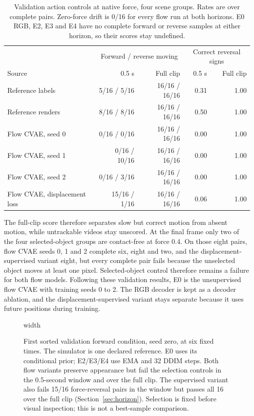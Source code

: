 \documentclass[11pt,a4paper]{article}
\begin{document}
\begin{table}[!ht]
\centering
\begin{tabular}{lrrrr}
\hline
 & \multicolumn{2}{c}{Forward / reverse moving} & \multicolumn{2}{c}{Correct reversal signs} \\
Source & 0.5 s & Full clip & 0.5 s & Full clip \\
\hline
Reference labels & 5/16 / 5/16 & 16/16 / 16/16 & 0.31 & 1.00 \\
Reference renders & 8/16 / 8/16 & 16/16 / 16/16 & 0.50 & 1.00 \\
Flow CVAE, seed 0 & 0/16 / 0/16 & 16/16 / 16/16 & 0.00 & 1.00 \\
Flow CVAE, seed 1 & 0/16 / 10/16 & 16/16 / 16/16 & 0.00 & 1.00 \\
Flow CVAE, seed 2 & 0/16 / 3/16 & 16/16 / 16/16 & 0.00 & 1.00 \\
Flow CVAE, displacement loss & 15/16 / 1/16 & 16/16 / 16/16 & 0.06 & 1.00 \\
\hline
\end{tabular}
\caption{Validation action controls at native force, four scene groups. Rates are over complete pairs. Zero-force drift is 0/16 for every flow run at both horizons. E0 RGB, E2, E3 and E4 have no complete forward or reverse samples at either horizon, so their scores stay undefined.}
\label{tab:horizon}
\end{table}

The full-clip score therefore separates slow but correct motion from absent motion, while untrackable videos stay unscored. At the final frame only two of the four selected-object groups are contact-free at force 0.4. On those eight pairs, flow CVAE seeds 0, 1 and 2 complete six, eight and two, and the displacement-supervised variant eight, but every complete pair fails because the unselected object moves at least one pixel. Selected-object control therefore remains a failure for both flow models. Following these validation results, E0 is the unsupervised flow CVAE with training seeds 0 to 2. The RGB decoder is kept as a decoder ablation, and the displacement-supervised variant stays separate because it uses future positions during training.

\clearpage
\begin{figure}[!ht]
\centering
\pdfximage width\linewidth{report/figures/multiscene_validation.png}\pdfrefximage\pdflastximage
\caption{First sorted validation forward condition, seed zero, at six fixed times. The simulator is one declared reference. E0 uses its conditional prior; E2/E3/E4 use EMA and 32 DDIM steps. Both flow variants preserve appearance but fail the selection controls in the 0.5-second window and over the full clip. The supervised variant also fails 15/16 force-reversal pairs in the window but passes all 16 over the full clip (Section~\ref{sec:horizon}). Selection is fixed before visual inspection; this is not a best-sample comparison.}
\label{fig:multiscene}
\end{figure}
\clearpage
\end{document}
